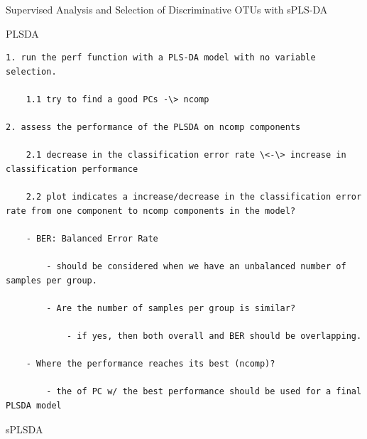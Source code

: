 \documentclass[
]{book}
\begin{document}
Supervised Analysis and Selection of Discriminative OTUs with sPLS-DA

PLSDA

\begin{verbatim}
1. run the perf function with a PLS-DA model with no variable selection.

    1.1 try to find a good PCs -\> ncomp

2. assess the performance of the PLSDA on ncomp components

    2.1 decrease in the classification error rate \<-\> increase in classification performance

    2.2 plot indicates a increase/decrease in the classification error rate from one component to ncomp components in the model?

    - BER: Balanced Error Rate

        - should be considered when we have an unbalanced number of samples per group.

        - Are the number of samples per group is similar?

            - if yes, then both overall and BER should be overlapping.

    - Where the performance reaches its best (ncomp)?

        - the of PC w/ the best performance should be used for a final PLSDA model
\end{verbatim}

sPLSDA
\end{document}
